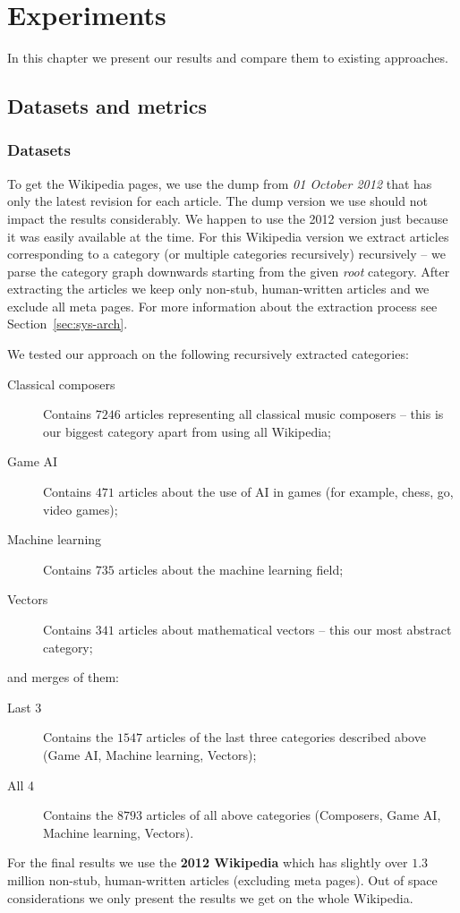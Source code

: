 \chapter{Experiments}
\label{cap:experiments}

In this chapter we present our results and compare them to existing approaches.

\section{Datasets and metrics}

\subsection{Datasets}

To get the Wikipedia pages, we use the dump from \emph{01 October 2012} that
has only the latest revision for each article. The dump version we use should
not impact the results considerably. We happen to use the 2012 version just
because it was easily available at the time.
For this Wikipedia version we extract articles corresponding to a category (or
multiple categories recursively) recursively -- we parse the category graph
downwards starting from the given \emph{root} category. After extracting the
articles we keep only non-stub, human-written articles and we exclude all meta
pages. For more information about the extraction process see
Section~\vref{sec:sys-arch}.

We tested our approach on the following recursively extracted categories:
\begin{description}
  \item[Classical composers] Contains \(7246\) articles representing all
  classical music composers -- this is our biggest category apart from using all
  Wikipedia;
  \item[Game \acl{AI}] Contains \(471\) articles about the use
  of \ac{AI} in games (for example, chess, go, video games);
  \item[Machine learning] Contains \(735\) articles about the machine learning
  field;
  \item[Vectors] Contains \(341\) articles about mathematical vectors -- this
  our most abstract category;
\end{description}
and merges of them:
\begin{description}
  \item[Last 3] Contains the \(1547\) articles of the last three categories
  described above (Game \ac{AI}, Machine learning, Vectors);
  \item[All 4] Contains the \(8793\) articles of all above categories
  (Composers, Game \ac{AI}, Machine learning, Vectors).
\end{description}
For the final results we use the \textbf{2012 Wikipedia} which has slightly
over \(1.3\) million non-stub, human-written articles (excluding meta pages).
Out of space considerations we only present the results we get on the whole
Wikipedia.

